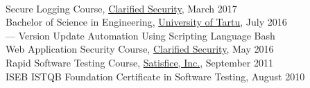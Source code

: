 \documentclass[a4paper, 12pt]{article}
\begin{document}
\\
Secure Logging Course, \href{https://clarifiedsecurity.com/secure-logging-training/}{Clarified Security}, {\footnotesize{March 2017}}\\
Bachelor of Science in Engineering, \href{https://www.ut.ee/en}{University of Tartu}, {\footnotesize{July 2016}}\\
\indent --- Version Update Automation Using Scripting Language Bash\\
Web Application Security Course, \href{https://www.clarifiedsecurity.com/web-application-security-training/}{Clarified Security}, {\footnotesize{May 2016}}\\
Rapid Software Testing Course, \href{http://www.satisfice.com/info_rst.shtml}{Satisfice, Inc.}, {\footnotesize{September 2011}}\\
ISEB ISTQB Foundation Certificate in Software Testing, {\footnotesize{August 2010}}\\

\pagestyle{empty}

\newpage
\end{document}
